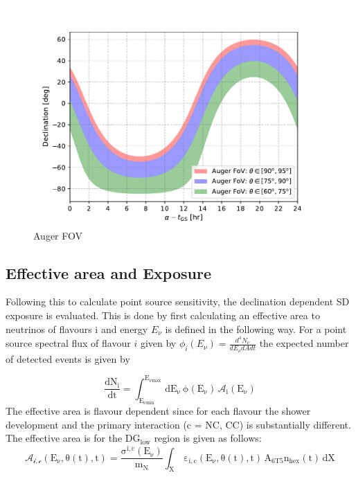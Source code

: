 \begin{figure}[t!]
  \centering
  \includegraphics[width=14.5cm]{thesis_figures/PointLimits/Auger_FoV_1.pdf}
  \caption{Auger FOV}
  \label{fig:Auger_FoV}
\end{figure}

\subsection{Effective area and Exposure}
\label{subsec:psource_area}
Following this to calculate point source sensitivity, the declination dependent SD exposure is evaluated. This is done by first calculating an effective area to neutrinos of flavours i and energy $E_{\nu}$ is defined in the following way. For a point source spectral flux of flavour $i$ given by $\phi_i(E_{\nu}) = \frac{d^4 N_{\nu}}{dE_{\nu} dA dt}$ the expected number of detected events is given by 

\begin{equation}
  \label{eq:expected_events_point}
  \mathrm{\frac{dN_{i}}{dt} = \int_{E_{\nu min}}^{E_{\nu max}} \, dE_{\nu} \, \phi(E_{\nu}) \, \mathcal{A}_i(E_{\nu})}
\end{equation}
The effective area is flavour dependent since for each flavour the shower development and the primary interaction (c = NC, CC) is substantially different. The effective area is for the DG$\mathrm{_{low}}$ region is given as follows:
\begin{equation}
  \label{eq:effective_area}
  \mathrm{\mathcal{A_{i,c}}(E_{\nu},\theta(t),t) = \frac{\sigma^{i,c}(E_{\nu})}{m_N} \int_{X} \, \varepsilon_{i,c}(E_{\nu},\theta(t),t) \, A_{6T5} n_{hex}(t) \, dX}
\end{equation}

